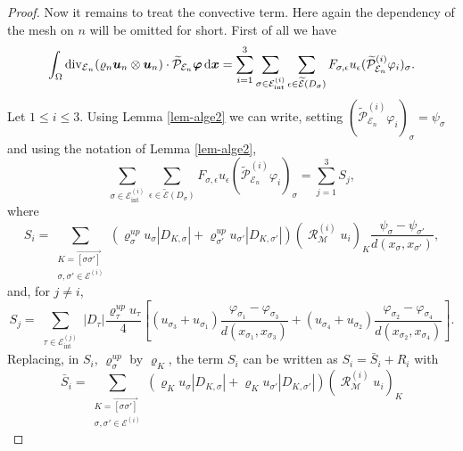 \documentclass{amsart}
\numberwithin{equation}{section}
\begin{document}
\begin{proof}
Now it remains to treat the convective term. Here again  the dependency of the mesh on $n$ will be omitted for short.
 First of all we have
\begin{equation*}
\int_\Omega \operatorname{div}_{\operatorname{{\mathcal{E}}}_n} ( {\varrho}_n {{\boldsymbol u}}_n \otimes {{\boldsymbol u}}_n) \cdot  \widetilde{\mathcal P}_{{{\mathcal E}}_n}{{\boldsymbol \varphi}} {\, {\rm d}{{\boldsymbol x}}} = \sum_{i=1}^3 \sum_{{{\sigma}} \in {{\mathcal E}_{\mathrm{int}}^{(i)}}} \sum_{{\epsilon} \in {\widetilde {{\mathcal E}}}(D_{{\sigma}})}
F_{{{\sigma}},{\epsilon}} u_{\epsilon}  (\widetilde{\mathcal P}^{(i)}_{{{\mathcal E}}_n} \varphi_i)_{{\sigma}}.
\end{equation*}
Let $1 \le i \le 3 $. Using Lemma \ref{lem-alge2} we can write, setting $(\widetilde{\mathcal P}^{(i)}_{{{\mathcal E}}_n} \varphi_i)_{{\sigma}}=\psi_{{\sigma}}$
and using the notation of Lemma \ref{lem-alge2},
\begin{equation*}
 \sum_{{{\sigma}} \in {{\mathcal E}_{\mathrm{int}}^{(i)}}} \sum_{{\epsilon} \in {\widetilde {{\mathcal E}}}(D_{{\sigma}})}
F_{{{\sigma}},{\epsilon}} u_{\epsilon}  (\widetilde{\mathcal P}^{(i)}_{{{\mathcal E}}_n} \varphi_i)_{{\sigma}} = \sum_{j=1}^3 S_{j},
\end{equation*} 
where
\[
    S_i  = \sum_{\substack{K =  \overrightarrow{[{{\sigma}} {{\sigma}}']}\\ {{\sigma}}, {{\sigma}}' \in {\mathcal {E}^{(i)}}}}
    ({\varrho}_{{\sigma}}^{up} u_{{\sigma}} |D_{ K,{{\sigma}}}| + {\varrho}_{{{\sigma}}'}^{up} u_{{{\sigma}}'} |D_{ K,{{\sigma}}'}|)(\operatorname{{\mathcal{R}}}_{{\mathcal M}}^{(i)}u_i)_K
    \frac {\psi_{{\sigma}} - \psi_{{{\sigma}}'}}{d(x_{{\sigma}}, x_{{{\sigma}}'})},
\]
and, for $j \ne i$,
\[
    S_{j} = \sum_{\substack{{\tau} \in {{\mathcal E}_{\mathrm{int}}^{(j)}}}} |D_{\tau} | \frac{ {\varrho}^{up}_{\tau} u_{\tau}}{4} \left[  \left(   {u_{{{\sigma}}_3}+u_{{{\sigma}}_1}}\right) \frac {\varphi_{{{\sigma}}_1} - \varphi_{{{\sigma}}_3}}{d(x_{{{\sigma}}_1},x_{{{\sigma}}_3})} +  \left(   {u_{{{\sigma}}_4}+u_{{{\sigma}}_2}}\right) \frac {\varphi_{{{\sigma}}_2} - \varphi_{{{\sigma}}_4}}{d(x_{{{\sigma}}_2},x_{{{\sigma}}_4})}    \right].
\]
Replacing, in $S_i$, ${\varrho}^{up}_{{\sigma}}$ by ${\varrho}_K$,  the term $S_i$ can be written as $S_i=\bar S_i + R_i$ with
\[
\bar S_i  = \sum_{\substack{K =  \overrightarrow{[{{\sigma}} {{\sigma}}']}\\ {{\sigma}}, {{\sigma}}' \in {\mathcal {E}^{(i)}}}}
    ({\varrho}_K u_{{\sigma}} |D_{ K,{{\sigma}}}| + {\varrho}_K u_{{{\sigma}}'} |D_{ K,{{\sigma}}'}|)(\operatorname{{\mathcal{R}}}_{{\mathcal M}}^{(i)}u_i)_K
\]
\end{proof}
\end{document}
